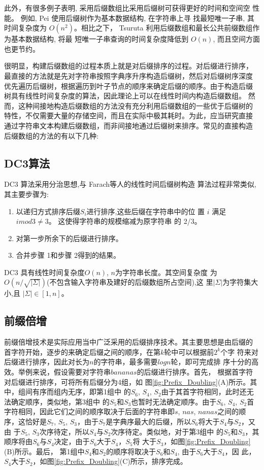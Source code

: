 此外，有很多例子表明, 采用后缀数组比采用后缀树可获得更好的时间和空间空
性能。 例如, Pei\cite{Pei2013} 使用后缀树作为基本数据结构, 在字符串上寻
找最短唯一子串, 其时间复杂度为 $O(n^2)$。相比之下， Tsuruta
\cite{Tsuruta2014} 利用后缀数组和最长公共前缀数组作为基本数据结构, 将最
短唯一子串查询的时间复杂度降低到 $O(n)$, 而且空间方面也更节约。

很明显，构建后缀数组的过程本质上就是对后缀排序的过程。对后缀进行排序，
最直接的方法就是先对字符串按照字典序升序构造后缀树，然后对后缀树序深度
优先遍历后缀树，根据遍历到叶子节点的顺序来确定后缀的顺序。由于构造后缀
树具有线性时间复杂度的算法，因此理论上可以在线性时间内构造后缀数组。 然
而，这种间接地构造后缀数组的方法没有充分利用后缀数组的一些优于后缀树的
特性，不仅需要大量的存储空间，而且在实际中极其耗时。为此，应当研究直接
通过字符串文本构建后缀数组，而非间接地通过后缀树来排序。常见的直接构造
后缀数组的方法的有以下几种:

\subsection{DC3算法}
\label{sec:KA}

DC3 算法采用分治思想,与 Farach\cite{Farach1997}等人的线性时间后缀树构造
算法过程非常类似,其主要步骤为:

\begin{enumerate}
\item 以递归方式排序后缀$S_i$进行排序,这些后缀在字符串中的位
  置 $i$ 满足 $i mod 3 \neq 3$。 这使得字符串的规模缩减为原字符串
  的 2/3。
\item 对第一步所余下的后缀进行排序。
\item 合并步骤 1和步骤 2得到的结果。
\end{enumerate}

DC3 具有线性时间复杂度$O(n)$, $n$为字符串长度。其空间复杂度
为 $O(n/\sqrt{|\Sigma|})$(不包含输入字符串及建好的后缀数组所占空间),这
里$|\Sigma|$为字符集大小,且 $|\Sigma| \in [1, n]$。

\subsection{前缀倍增}

前缀倍增技术是实际应用当中广泛采用的后缀排序技术。其主要思想是由后缀的
首字符开始，逐步的来确定后缀之间的顺序，在第$k$轮中可以根据前$2^k$个字
符来对后缀进行排序，因此对长为$n$的字符串，最多需要$logn$轮，即可完成排
序十分的高效。举例来说，假设需要对字符串$bananas$的后缀进行排序。首先，
根据首字符对后缀进行排序，可将所有后缀分为4组，如
图\ref{fig:Prefix_Doubling}(A)所示。其中，组间有序而组内无序，即第1组中
的$S_6$, $S_4$,
$S_2$由于其首字符相同，此时还无法确定顺序，类似地，第3组中
的$S_5$和$S_3$也暂时无法确定顺序。由于$S_6$, $S_4$,
$S_2$首字符相同，因此它们之间的顺序取决于后面的字符串即$s$, $nas$,
$nanas$之间的顺序，这恰好是$S_7$, $S_5$,
$S_3$，由于$S_7$是字典序最大的后缀，所以$S_6$将大于$S_4$与$S_2$，又由
于$S_5$,
$S_3$次序待定，所以$S_4$与$S_2$次序待定。类似地，对于第3组中
的$S_5$和$S_3$，其顺序将由$S_6$与$S_4$决定，由于$S_6$大于$S_4$，$S_5$将
大于$S_3$，如图\ref{fig:Prefix_Doubling}(B)所示。最后，
第1组中$S_4$和$S_2$的顺序将取决于$S_6$和$S_4$, 由于$S_6$大于$S_4$，因
此，$S_4 $大于$S_2$，如图\ref{fig:Prefix_Doubling}(C)所示，排序完成。

